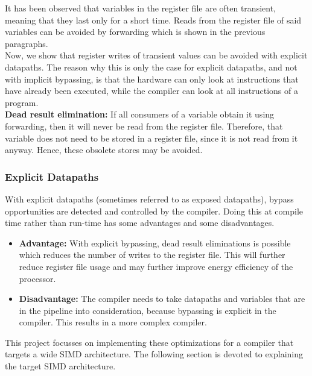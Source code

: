 It has been observed that variables in the register file are often transient, meaning that they last only for a short time.  Reads from the register file of said variables can be avoided by forwarding which is shown in the previous paragraphs.\\

Now, we show that register writes of transient values can be avoided with explicit datapaths. The reason why this is only the case for explicit datapaths, and not with implicit bypassing, is that the hardware can only look at instructions that have already been executed, while the compiler can look at all instructions of a program.\\

\textbf{Dead result elimination:} 
If all consumers of a variable obtain it using forwarding, then it will never be read from the register file. Therefore, that variable does not need to be stored in a register file, since it is not read from it anyway. Hence, these obsolete stores may be avoided.  

\subsubsection{Explicit Datapaths}
With explicit datapaths (sometimes referred to as exposed datapaths), bypass opportunities are detected and controlled by the compiler. Doing this at compile time rather than run-time has some advantages and some disadvantages.
\begin{itemize}
  \item\textbf{Advantage:}
    With explicit bypassing, dead result eliminations is possible which reduces the number of writes to the register file. This will further reduce register file usage and may further improve energy efficiency of the processor.
  \item\textbf{Disadvantage:}
    The compiler needs to take datapaths and variables that are in the pipeline into consideration, because bypassing is explicit in the compiler. This results in a more complex compiler.
\end{itemize}

This project focusses on implementing these optimizations for a compiler that targets a wide SIMD architecture. The following section is devoted to explaining the target SIMD architecture.